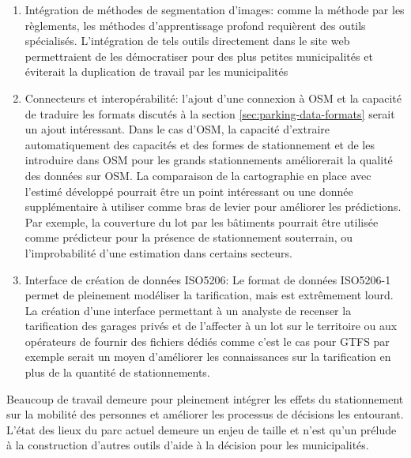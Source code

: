 \begin{enumerate}
            \item Intégration de méthodes de segmentation d'images: comme la méthode par les règlements, les méthodes d'apprentissage profond requièrent des outils spécialisés.  L'intégration de tels outils directement dans le site web permettraient de les démocratiser pour des plus petites municipalités et éviterait la duplication de travail par les municipalités
            \item Connecteurs et interopérabilité: l'ajout d'une connexion à \ac{OSM} et la capacité de traduire les formats discutés à la section \ref{sec:parking-data-formats} serait un ajout intéressant. Dans le cas d'\ac{OSM}, la capacité d'extraire automatiquement des capacités et des formes de stationnement et de les introduire dans \ac{OSM} pour les grands stationnements améliorerait la qualité des données sur \ac{OSM}. La comparaison de la cartographie en place avec l'estimé développé pourrait être un point intéressant ou une donnée supplémentaire à utiliser comme bras de levier pour améliorer les prédictions. Par exemple, la couverture du lot par les bâtiments pourrait être utilisée comme prédicteur pour la présence de stationnement souterrain, ou l'improbabilité d'une estimation dans certains secteurs. 
            \item Interface de création de données ISO5206: Le format de données ISO5206-1 permet de pleinement modéliser la tarification, mais est extrêmement lourd. La création d'une interface permettant à un analyste de recenser la tarification des garages privés et de l'affecter à un lot sur le territoire ou aux opérateurs de fournir des fichiers dédiés comme c'est le cas pour GTFS par exemple serait un moyen d'améliorer les connaissances sur la tarification en plus de la quantité de stationnements.
        \end{enumerate}
        
        Beaucoup de travail demeure pour pleinement intégrer les effets du stationnement sur la mobilité des personnes et améliorer les processus de décisions les entourant. L'état des lieux du parc actuel demeure un enjeu de taille et n'est qu'un prélude à la construction d'autres outils d'aide à la décision pour les municipalités.